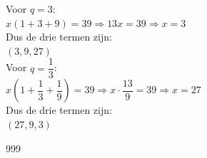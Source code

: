 \documentclass[a4paper]{article}
\begin{document}
Voor $q = 3$:\\

$x\left(1+3+9\right)=39 \Rightarrow 13x=39 \Rightarrow x=3$\\

Dus de drie termen zijn:\\

$(3,9,27)$\\

Voor $q = \dfrac{1}{3}$:\\

$x\left(1+\dfrac{1}{3}+\dfrac{1}{9}\right)=39 \Rightarrow x \cdot \dfrac{13}{9}=39 \Rightarrow x=27$\\

Dus de drie termen zijn:\\

$(27,9,3)$\\


\begin{thebibliography}{999}
\end{thebibliography}
\end{document}

